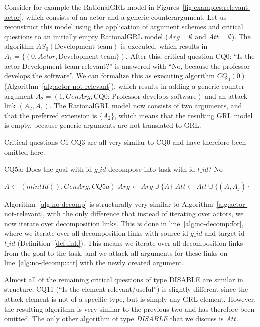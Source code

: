 Consider for example the RationalGRL model in Figures~\ref{fig:examples:relevant-actor}, which consists of an actor and a generic counterargument. Let us reconstruct this model using the application of argument schemes and critical questions to an initially empty RationalGRL model ($Arg=\emptyset$ and $Att=\emptyset$). The algorithm $AS_0(\text{Development team})$ is executed, which results in $A_1=\{(0,Actor,\text{Development team}\})$. After this, critical question CQ0: ``Is the actor Development team relevant?'' is answered with ``No, because the professor develops the software''. We can formalize this as executing algorithm $CQ_0(0)$ (Algorithm~\ref{alg:actor-not-relevant}), which results in adding a generic counter argument $A_2=(1, GenArg, \text{CQ0: Professor develops software})$ and an attack link $(A_2,A_1)$. The RationalGRL model now consists of two arguments, and that the preferred extension is $\{A_2\}$, which means that the resulting GRL model is empty, because generic arguments are not translated to GRL.

Critical questions C1-CQ3 are all very similar to CQ0 and have therefore been omitted here.

\begin{algorithm}[h]
  \caption{CQ5a: Does the goal with id $g\_id$ decompose into task with id $t\_id$? No}\label{alg:no-decomp}
  \begin{algorithmic}[1]
    \State $A \leftarrow (mintId(),GenArg,CQ5a)$\label{alg:no-decomp:genarg}
    \State $Arg\leftarrow Arg \cup \{A\}$\label{alg:no-decomp:genarg2}
    \label{alg:no-decomp:for}
      \State $Att \leftarrow Att \cup \{(A,A_j)\}$\label{alg:no-decomp:att}
    \EndFor
    \EndProcedure
  \end{algorithmic}
\end{algorithm}

Algorithm~\ref{alg:no-decomp} is structurally very similar to Algorithm~\ref{alg:actor-not-relevant}, with the only difference that instead of iterating over actors, we now iterate over decomposition links. This is done in line~\ref{alg:no-decomp:for}, where we iterate over all decomposition links with source id $g\_id$ and target id $t\_id$ (Definition~\ref{def:link}). This means we iterate over all decomposition links from the goal to the task, and we attack all arguments for these links on line~\ref{alg:no-decomp:att} with the newly created argument.

Almost all of the remaining critical questions of type DISABLE are similar in structure. CQ11 (``Is the element relevant/useful'') is slightly different since the attack element is not of a specific type, but is simply any GRL element. However, the resulting algorithm is very similar to the previous two and has therefore been omitted. The only other algorithm of type \emph{DISABLE} that we discuss is $Att$.

